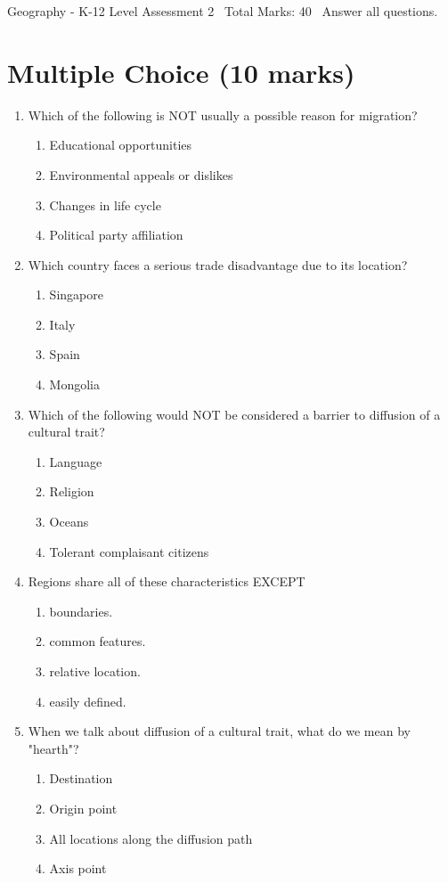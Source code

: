 \documentclass[12pt]{article}
\begin{document}
\begin{center}
Geography - K-12 Level Assessment 2 \
Total Marks: 40 \
Answer all questions.
\end{center}

\section*{Multiple Choice (10 marks)}
\begin{enumerate}[label=\arabic*.]
\item Which of the following is NOT usually a possible reason for migration?
\begin{enumerate}[label=(\alph*)]
    \item Educational opportunities
    \item Environmental appeals or dislikes
    \item Changes in life cycle
    \item Political party affiliation
\end{enumerate}
\item Which country faces a serious trade disadvantage due to its location?
\begin{enumerate}[label=(\alph*)]
    \item Singapore
    \item Italy
    \item Spain
    \item Mongolia
\end{enumerate}
\item Which of the following would NOT be considered a barrier to diffusion of a cultural trait?
\begin{enumerate}[label=(\alph*)]
    \item Language
    \item Religion
    \item Oceans
    \item Tolerant complaisant citizens
\end{enumerate}
\item Regions share all of these characteristics EXCEPT
\begin{enumerate}[label=(\alph*)]
    \item boundaries.
    \item common features.
    \item relative location.
    \item easily defined.
\end{enumerate}
\item When we talk about diffusion of a cultural trait, what do we mean by "hearth"?
\begin{enumerate}[label=(\alph*)]
    \item Destination
    \item Origin point
    \item All locations along the diffusion path
    \item Axis point
\end{enumerate}
\end{enumerate}
\end{document}
